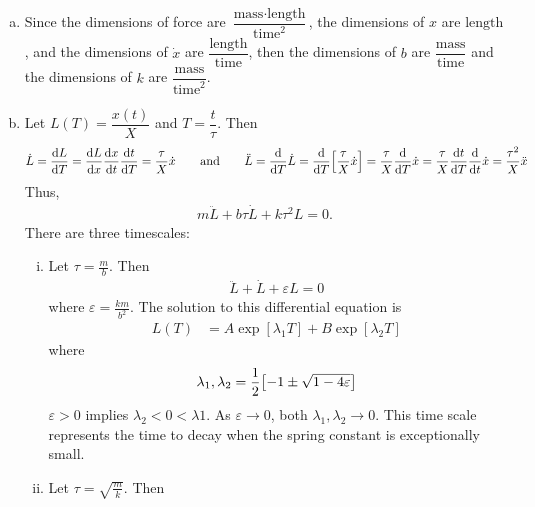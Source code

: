 \documentclass{article} %
\theoremstyle{plain}
\newcommand{\E}{\varepsilon}
\numberwithin{equation}{section} %
\numberwithin{figure}{section} %
\numberwithin{table}{section} %
\begin{document}
\begin{enumerate}[(a)]
    \item
        Since the dimensions of force are $\dfrac{\text{mass}\cdot\text{length}}{\text{time}^2}$, the dimensions of $x$ are $\text{length}$, and the dimensions of $\dot{x}$ are $\dfrac{\text{length}}{\text{time}}$, then the dimensions of $b$ are $\dfrac{\text{mass}}{\text{time}}$ and the dimensions of $k$ are $\dfrac{\text{mass}}{\text{time}^2}$.
    \item
        Let $L(T) = \dfrac{x(t)}{X}$ and $T = \dfrac{t}{\tau}$.  Then
        \begin{align*}
            \dot{L} = \frac{\dd L}{\dd T} = \frac{\dd L}{\dd x} \frac{\dd x}{\dd t} \frac{\dd t}{\dd T} = \frac{\tau}{X}\dot{x} \qquad \text{and} \qquad \ddot{L} = \frac{\dd}{\dd T}\dot{L} = \frac{\dd}{\dd T} \qty[\frac{\tau}{X}\dot{x}] = \frac{\tau}{X} \frac{\dd}{\dd T} \dot{x} = \frac{\tau}{X}\frac{\dd t}{\dd T} \frac{\dd}{\dd t}\dot{x} = \frac{\tau^2}{X}\ddot{x}
        \end{align*}
        Thus,
        \begin{align*}
            m\ddot{L} + b\tau\dot{L} + k\tau^2 L = 0.
        \end{align*}
        There are three timescales:
        \begin{enumerate}[(i)]
            \item
                Let $\tau = \frac{m}{b}$.  Then
                \begin{align*}
                    \ddot{L} + \dot{L} + \E L = 0
                \end{align*}
                where $\E = \frac{km}{b^2}$.  The solution to this differential equation is
                \begin{align*}
                    L(T) &= A\exp[\lambda_1 T] + B\exp[\lambda_2 T]
                \end{align*}
                where
                \begin{align*}
                    \lambda_1, \lambda_2 = \frac{1}{2}\qty[-1 \pm \sqrt{1 - 4\E}]
                \end{align*}
                $\E > 0$ implies $\lambda_2 < 0 < \lambda 1$.  As $\E \rightarrow 0$, both $\lambda_1, \lambda_2 \rightarrow 0$.  This time scale represents the time to decay when the spring constant is exceptionally small.
            \item
                Let $\tau = \sqrt{\frac{m}{k}}$.  Then
                \begin{align*}

\end{align*}
\end{enumerate}
\end{enumerate}
\end{document}
